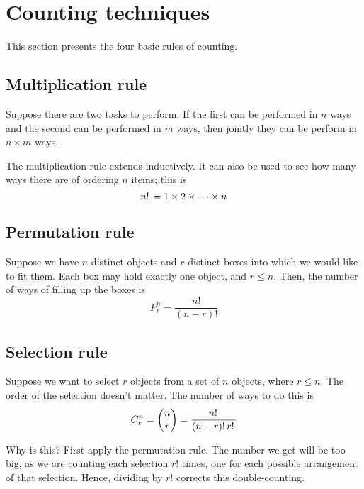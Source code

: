 \documentclass[11pt]{article}
\begin{document}
\section{Counting techniques}

This section presents the four basic rules of counting.

\subsection{Multiplication rule}
\label{sec:multiplication-rule}

Suppose there are two tasks to perform. If the first can be performed in $n$
ways and the second can be performed in $m$ ways, then jointly they can be
perform in $n \times m$ ways.

The multiplication rule extends inductively. It can also be used to see how
many ways there are of ordering $n$ items; this is
\begin{equation*}
    n!\, = 1 \times 2 \times \cdots \times n
\end{equation*}

\subsection{Permutation rule}
\label{sec:permutation-rule}

Suppose we have $n$ distinct objects and $r$ distinct boxes into which we would
like to fit them. Each box may hold exactly one object, and $r \leq n$. Then,
the number of ways of filling up the boxes is
\begin{equation}
    \label{eq:permutation-rule}
    P_r^n = \frac{n!}{(n-r)!}
\end{equation}

\subsection{Selection rule}
\label{sec:selection-rule}

Suppose we want to select $r$ objects from a set of $n$ objects, where
$r \leq n$. The order of the selection doesn't matter. The number of ways to do
this is
\begin{equation}
    \label{eq:selection-rule}
    C_r^n = \binom{n}{r} = \frac{n!\,}{(n-r)!\, r!\,}
\end{equation}

Why is this? First apply the permutation rule. The number we get will be too
big, as we are counting each selection $r!$ times, one for each possible
arrangement of that selection. Hence, dividing by $r!$ corrects this
double-counting.
\end{document}
